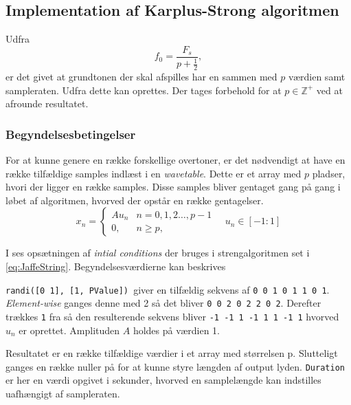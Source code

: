 \subsection{Implementation af Karplus-Strong algoritmen}
Udfra 
\begin{equation}
f_0 = \frac{F_s}{p + \frac{1}{2}},
\end{equation} er det givet at grundtonen der skal afspilles har en sammen med $p$ værdien samt sampleraten\cite{Karplus1983}. Udfra dette kan  oprettes. 
Der tages forbehold for at $p \in \mathbb{Z^+}$ ved at afrounde resultatet.  

\subsubsection{Begyndelsesbetingelser}
For at kunne genere en række forskellige overtoner, er det nødvendigt at have en række tilfældige samples indlæst i en \emph{wavetable}. Dette er et array med $p$ pladser, hvori der ligger en række samples. Disse samples bliver gentaget gang på gang i løbet af algoritmen, hvorved der opstår en række gentagelser.
\begin{equation}
    x_{n} = 
    \begin{cases} 
    A u_n & n = 0,1,2 \dots , p - 1\\
    0, & n \geq p,
\end{cases} 
\quad u_n \in [-1:1]  
\end{equation}


I  ses opsætningen af \emph{intial conditions} der bruges i strengalgoritmen set i \eqref{eq:JaffeString}. Begyndelsesværdierne kan beskrives \cite{Jaffe1983}


\texttt{randi([0 1], [1, PValue]) }giver en tilfældig sekvens af \texttt{0 0 1 0 1 1 0 1}. \emph{Element-wise} ganges denne med 2 så det bliver \texttt{0 0 2 0 2 2 0 2}. Derefter trækkes \texttt{1} fra så den resulterende sekvens bliver \texttt{-1 -1 1 -1 1 1 -1 1} hvorved $u_n$ er oprettet. Amplituden $A$ holdes på værdien 1.

Resultatet er en række tilfældige værdier i et array med størrelsen p. Slutteligt ganges en række nuller på for at kunne styre længden af output lyden. \texttt{Duration} er her en værdi opgivet i sekunder, hvorved en samplelængde kan indstilles uafhængigt af sampleraten.
